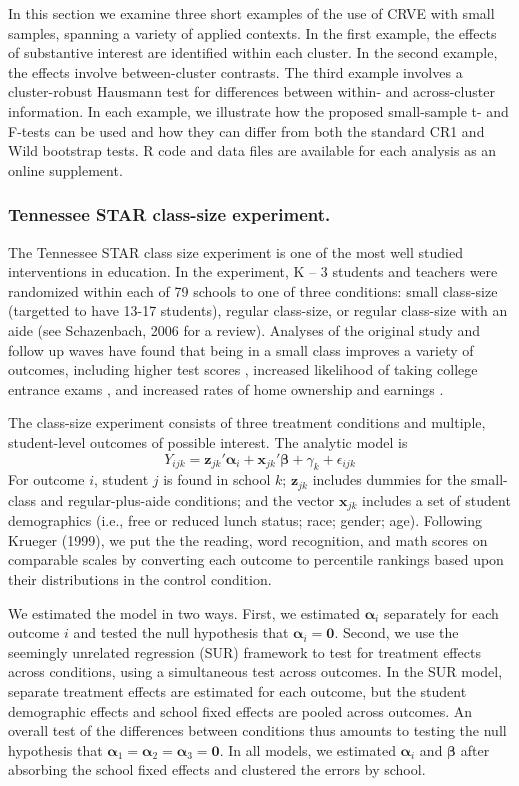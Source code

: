 \documentclass[12pt]{article}
\newcommand{\bm}{\mathbf}
\newcommand{\bs}{\boldsymbol}
\begin{document}
In this section we examine three short examples of the use of CRVE with small samples, spanning a variety of applied contexts. In the first example, the effects of substantive interest are identified within each cluster. In the second example, the effects involve between-cluster contrasts. The third example involves a cluster-robust Hausmann test for differences between within- and across-cluster information. In each example, we illustrate how the proposed small-sample t- and F-tests can be used and how they can differ from both the standard CR1 and Wild bootstrap tests. R code and data files are available for each analysis as an online supplement.

\subsubsection{Tennessee STAR class-size experiment.} 

The Tennessee STAR class size experiment is one of the most well studied interventions in education.  In the experiment, K – 3 students and teachers were randomized within each of 79 schools to one of three conditions: small class-size (targetted to have 13-17 students), regular class-size, or regular class-size with an aide (see Schazenbach, 2006 for a review). Analyses of the original study and follow up waves have found that being in a small class improves a variety of outcomes, including higher test scores \citep{Schanzenbach2006what}, increased likelihood of taking college entrance exams \citep{Krueger2001effect}, and increased rates of home ownership and earnings \citep{Chetty2011how}. 

The class-size experiment consists of three treatment conditions and multiple, student-level outcomes of possible interest. The analytic model is 
\begin{equation}
Y_{ijk} = \bm{z}_{jk}'\bs\alpha_i + \bm{x}_{jk}'\bs\beta + \gamma_k + \epsilon_{ijk}
\end{equation}
For outcome $i$, student $j$ is found in school $k$; $\bm{z}_{jk}$ includes dummies for the small-class and regular-plus-aide conditions; and the vector $\bm{x}_{jk}$ includes a set of student demographics (i.e., free or reduced lunch status; race; gender; age). Following Krueger (1999), we put the the reading, word recognition, and math scores on comparable scales by converting each outcome to percentile rankings based upon their distributions in the control condition.

We estimated the model in two ways. First, we estimated $\bs\alpha_i$ separately for each outcome $i$ and tested the null hypothesis that $\bs\alpha_i = \bm{0}$. Second, we use the seemingly unrelated regression (SUR) framework to test for treatment effects across conditions, using a simultaneous test across outcomes. In the SUR model, separate treatment effects are estimated for each outcome, but the student demographic effects and school fixed effects are pooled across outcomes. An overall test of the differences between conditions thus amounts to testing the null hypothesis that $\bs\alpha_1 = \bs\alpha_2 = \bs\alpha_3 = \bm{0}$. In all models, we estimated $\bs\alpha_i$ and $\bs\beta$ after absorbing the school fixed effects and clustered the errors by school.
\end{document}
